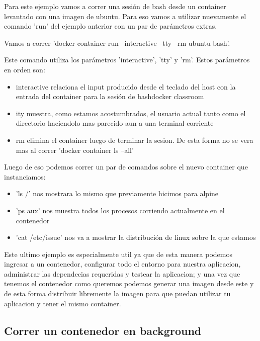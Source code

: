 \documentclass[11pt]{article} %
\begin{document}
Para este ejemplo vamos a correr una sesión de bash desde un container levantado con una imagen de ubuntu. Para eso vamos a utilizar nuevamente el comando 'run' del ejemplo anterior con un par de parámetros extras.

Vamos a correr 'docker container run --interactive --tty --rm ubuntu bash'. 

Este comando utiliza los parámetros 'interactive', 'tty' y 'rm'. Estos parámetros en orden son:
\begin{itemize}

	\item
    interactive relaciona el input producido desde el teclado del host con la entrada del container para la sesión de bashdocker classroom
    
    \item
    ity muestra, como estamos acostumbrados, el usuario actual tanto como el directorio haciendolo mas parecido aun a una terminal corriente
    
    \item
    rm elimina el container luego de terminar la sesion. De esta forma no se vera mas al correr 'docker container ls --all'
\end{itemize}

Luego de eso podemos correr un par de comandos sobre el nuevo container que instanciamos:
\begin{itemize}
	\item    
    'ls /' nos mostrara lo mismo que previamente hicimos para alpine
    
    \item  
    'ps aux' nos muestra todos los procesos corriendo actualmente en el contenedor
    
    \item  
    'cat /etc/issue' nos va a mostrar la distribución de linux sobre la que estamos
\end{itemize}

Este ultimo ejemplo es especialmente util ya que de esta manera podemos ingresar a un contenedor, configurar todo el entorno para nuestra aplicacion, administrar las dependecias requeridas y testear la aplicacion; y una vez que tenemos el contenedor como queremos podemos generar una imagen desde este y de esta forma distribuir libremente la imagen para que puedan utilizar tu aplicacion y tener el mismo container.

\subsection{Correr un contenedor en background}
\end{document}
